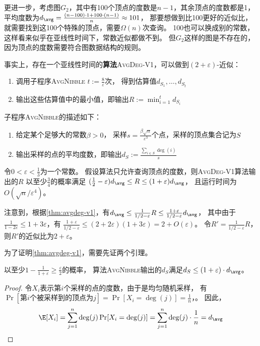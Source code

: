 \documentclass[lang=cn,newtx,10pt,scheme=chinese,chinesefont=nofont,citestyle=gb7714-2015, bibstyle=gb7714-2015]{elegantbook}
\begin{document}
\begin{refsection}
更进一步，考虑图$G_2$，其中有100个顶点的度数是$n-1$，其余顶点的度数都是1，
平均度数为$d_{\avg}=\frac{(n-100)\cdot1+100\cdot(n-1)}{n}\approx 101$，
那要想做到比100更好的近似比，就需要找到这100个特殊的顶点，需要$\Omega(n)$次查询。
100也可以换成别的常数，这样看来似乎在亚线性时间下，常数近似都做不到。
但$G_2$这样的图是不存在的，因为顶点的度数需要符合图数据结构的规则。

事实上，存在一个亚线性时间的\textbf{算法}\textsc{AvgDeg-V1}，可以做到$(2+\varepsilon)$-近似：
\begin{enumerate}
    \item 调用子程序\textsc{AvgNibble} $t:=\frac{8}{\varepsilon}$次，
    得到估算值$d_{S_1},\dots,d_{S_t}$
    \item 输出这些估算值中的最小值，即输出$R:=\min_{i=1}^t d_{S_i}$
\end{enumerate}

子程序\textsc{AvgNibble}的描述如下：
\begin{enumerate}
    \item 给定某个足够大的常数$\beta>0$，
    采样$s=\frac{\beta\sqrt{n}}{\varepsilon^3}$个点，采样的顶点集合记为$S$
    \item 输出采样的点的平均度数，即输出$d_S:=\frac{\sum_{i\in S}\deg(i)}{s}$
\end{enumerate}


\begin{theorem}\label{thm:avgdeg-v1}
    令$0<\varepsilon<\frac{1}{3}$为一个常数。
    假设算法只允许查询顶点的度数，则\textsc{AvgDeg-V1}算法输出的$R$
    以至少$\frac{3}{4}$的概率满足
    $(\frac{1}{2}-\varepsilon)d_{\avg}\le R\le(1+\varepsilon)d_{\avg}$，
    且运行时间为$O(\sqrt{n}/\varepsilon^4)$。
\end{theorem}

注意到，根据\cref{thm:avgdeg-v1}，有$d_{\avg}\le\frac{1}{1/2-\varepsilon}R\le\frac{1+\varepsilon}{1/2-\varepsilon}d_\avg$，
其中由于$\frac{1}{1-2\varepsilon}\le 1+3\varepsilon$，有
$\frac{1+\varepsilon}{1/2-\varepsilon}\le(2+2\varepsilon)(1+3\varepsilon)=2+O(\varepsilon)$。
令$R'=\frac{1}{1/2-\varepsilon}R$，则$R'$的近似比为$2+\varepsilon$。

为了证明\cref{thm:avgdeg-v1}，需要先证两个引理。

\begin{lemma}\label{lem:nibble-A}
    以至少$1-\frac{1}{1+\varepsilon}\ge\frac{\varepsilon}{2}$的概率，
    算法\textsc{AvgNibble}输出的$d_S$满足$d_S\le(1+\varepsilon)\cdot d_\avg$。
\end{lemma}
\begin{proof}
    令$X_i$表示第$i$个采样的点的度数，由于是均匀随机采样，
    有$\Pr[\text{第$i$个被采样到的顶点为}j]=\Pr[X_i=\deg(j)]=\frac{1}{n}$，。
    因此，
    \[
    \E[X_i]=\sum_{j=1}^n\deg(j)\Pr[X_i=\deg(j)]=\sum_{j=1}^n\deg(j)\cdot\frac{1}{n}=d_\avg
    \]


\end{proof}
\end{refsection}
\end{document}
